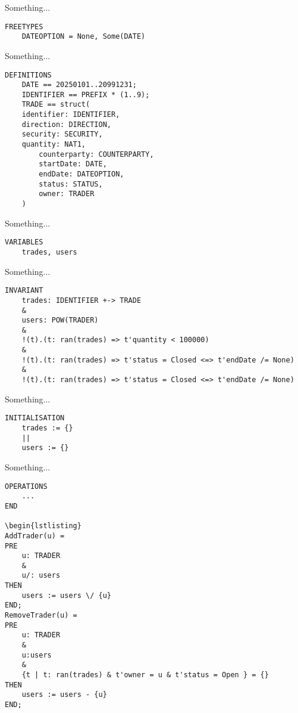 \documentclass{article}
\begin{document}
\hspace{-0.7cm} Something...

\begin{lstlisting}
FREETYPES
    DATEOPTION = None, Some(DATE)
\end{lstlisting}

\hspace{-0.7cm} Something...

\begin{lstlisting}
DEFINITIONS
    DATE == 20250101..20991231;
    IDENTIFIER == PREFIX * (1..9);
    TRADE == struct(
    identifier: IDENTIFIER, 
    direction: DIRECTION, 
    security: SECURITY, 
    quantity: NAT1, 
        counterparty: COUNTERPARTY,
        startDate: DATE, 
        endDate: DATEOPTION, 
        status: STATUS, 
        owner: TRADER 
    )
\end{lstlisting}

\hspace{-0.7cm} Something...

\begin{lstlisting}
VARIABLES
    trades, users
\end{lstlisting}
    
\hspace{-0.7cm} Something...

\begin{lstlisting}
INVARIANT
    trades: IDENTIFIER +-> TRADE
    &
    users: POW(TRADER)    
    &
    !(t).(t: ran(trades) => t'quantity < 100000)
    &
    !(t).(t: ran(trades) => t'status = Closed <=> t'endDate /= None)
    &
    !(t).(t: ran(trades) => t'status = Closed <=> t'endDate /= None)
\end{lstlisting}
        
\hspace{-0.7cm} Something...

\begin{lstlisting}
INITIALISATION
    trades := {}
    ||
    users := {}
\end{lstlisting}

\hspace{-0.7cm} Something...

\begin{lstlisting}
OPERATIONS
    ...
END

\begin{lstlisting}
AddTrader(u) = 
PRE
    u: TRADER
    &
    u/: users
THEN
    users := users \/ {u}
END;
RemoveTrader(u) = 
PRE
    u: TRADER
    &
    u:users
    &
    {t | t: ran(trades) & t'owner = u & t'status = Open } = {}
THEN
    users := users - {u}
END;
\end{lstlisting}
\end{document}
